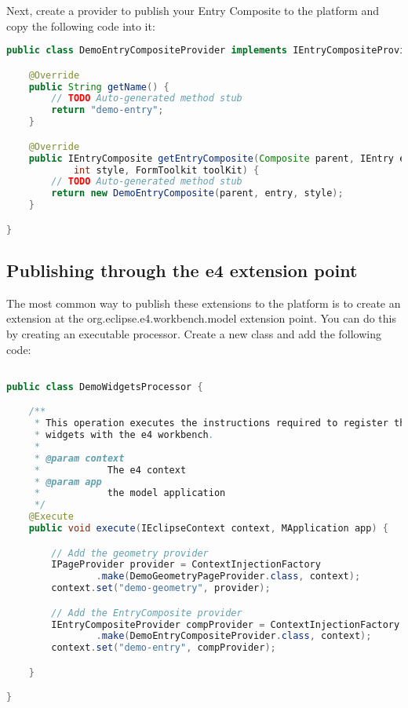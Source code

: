 Next, create a provider to publish your Entry Composite to the platform and
copy the following code into it:

\begin{lstlisting}[language=java]
public class DemoEntryCompositeProvider implements IEntryCompositeProvider {

    @Override
    public String getName() {
        // TODO Auto-generated method stub
        return "demo-entry";
    }

    @Override
    public IEntryComposite getEntryComposite(Composite parent, IEntry entry,
            int style, FormToolkit toolKit) {
        // TODO Auto-generated method stub
        return new DemoEntryComposite(parent, entry, style);
    }

}
\end{lstlisting}

\subsection{Publishing through the e4 extension point}

The most common way to publish these extensions to the platform is to create an
extension at the org.eclipse.e4.workbench.model extension point. You can do this
by creating an executable processor. Create a new class and add the following
code:

\begin{lstlisting}[language=java]

public class DemoWidgetsProcessor {

	/**
	 * This operation executes the instructions required to register the demo
	 * widgets with the e4 workbench.
	 * 
	 * @param context
	 *            The e4 context
	 * @param app
	 *            the model application
	 */
	@Execute
	public void execute(IEclipseContext context, MApplication app) {

		// Add the geometry provider
		IPageProvider provider = ContextInjectionFactory
				.make(DemoGeometryPageProvider.class, context);
		context.set("demo-geometry", provider);

		// Add the EntryComposite provider
		IEntryCompositeProvider compProvider = ContextInjectionFactory
				.make(DemoEntryCompositeProvider.class, context);
		context.set("demo-entry", compProvider);

	}

}

\end{lstlisting}

